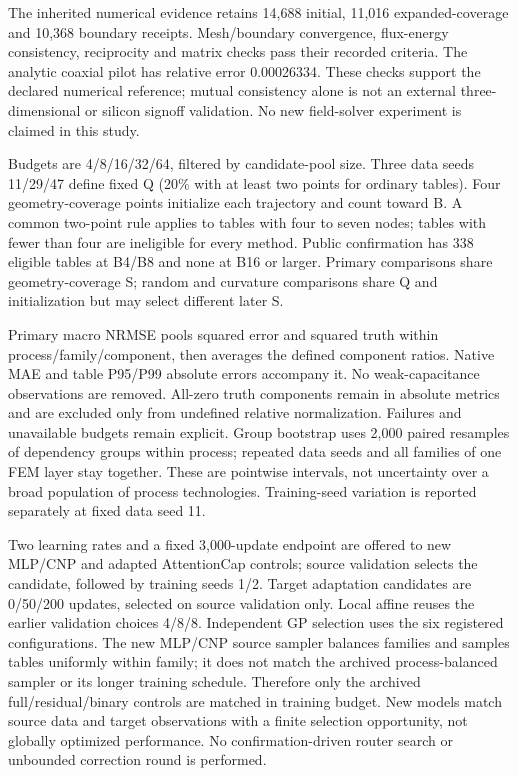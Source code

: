 \documentclass[10pt,twocolumn]{article}
\begin{document}
The inherited numerical evidence retains 14,688 initial, 11,016 expanded-coverage and 10,368 boundary receipts. Mesh/boundary convergence, flux-energy consistency, reciprocity and matrix checks pass their recorded criteria. The analytic coaxial pilot has relative error 0.00026334. These checks support the declared numerical reference; mutual consistency alone is not an external three-dimensional or silicon signoff validation. No new field-solver experiment is claimed in this study.

Budgets are 4/8/16/32/64, filtered by candidate-pool size. Three data seeds 11/29/47 define fixed Q (20\% with at least two points for ordinary tables). Four geometry-coverage points initialize each trajectory and count toward B. A common two-point rule applies to tables with four to seven nodes; tables with fewer than four are ineligible for every method. Public confirmation has 338 eligible tables at B4/B8 and none at B16 or larger. Primary comparisons share geometry-coverage S; random and curvature comparisons share Q and initialization but may select different later S.

Primary macro NRMSE pools squared error and squared truth within process/family/component, then averages the defined component ratios. Native MAE and table P95/P99 absolute errors accompany it. No weak-capacitance observations are removed. All-zero truth components remain in absolute metrics and are excluded only from undefined relative normalization. Failures and unavailable budgets remain explicit. Group bootstrap uses 2,000 paired resamples of dependency groups within process; repeated data seeds and all families of one FEM layer stay together. These are pointwise intervals, not uncertainty over a broad population of process technologies. Training-seed variation is reported separately at fixed data seed 11.

Two learning rates and a fixed 3,000-update endpoint are offered to new MLP/CNP and adapted AttentionCap controls; source validation selects the candidate, followed by training seeds 1/2. Target adaptation candidates are 0/50/200 updates, selected on source validation only. Local affine reuses the earlier validation choices 4/8/8. Independent GP selection uses the six registered configurations. The new MLP/CNP source sampler balances families and samples tables uniformly within family; it does not match the archived process-balanced sampler or its longer training schedule. Therefore only the archived full/residual/binary controls are matched in training budget. New models match source data and target observations with a finite selection opportunity, not globally optimized performance. No confirmation-driven router search or unbounded correction round is performed.
\end{document}
